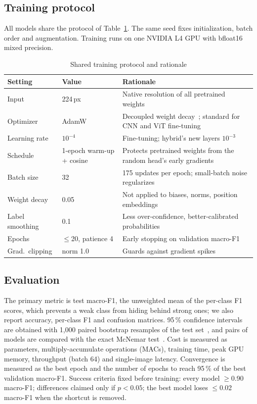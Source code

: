 \documentclass[conference]{IEEEtran}
\begin{document}
\subsection{Training protocol}
All models share the protocol of Table~\ref{tab:protocol}. The same seed fixes initialization, batch order and
augmentation. Training runs on one NVIDIA L4 GPU with bfloat16 mixed precision.

\begin{table}[t]
\caption{Shared training protocol and rationale}
\label{tab:protocol}
\centering
\footnotesize
\setlength{\tabcolsep}{3pt}
\begin{tabular}{@{}p{2.05cm}p{1.75cm}p{4.1cm}@{}}
\toprule
Setting & Value & Rationale \\
\midrule
Input & 224\,px & Native resolution of all pretrained weights \\
Optimizer & AdamW & Decoupled weight decay~\cite{loshchilov2019adamw}; standard for CNN and ViT fine-tuning \\
Learning rate & $10^{-4}$ & Fine-tuning; hybrid's new layers $10^{-3}$ \\
Schedule & 1-epoch warm-up + cosine & Protects pretrained weights from the random head's early gradients~\cite{goyal2017large,loshchilov2017sgdr} \\
Batch size & 32 & 175 updates per epoch; small-batch noise regularizes \\
Weight decay & 0.05 & Not applied to biases, norms, position embeddings \\
Label smoothing & 0.1 & Less over-confidence, better-calibrated probabilities~\cite{szegedy2016rethinking} \\
Epochs & $\le$20, patience 4 & Early stopping on validation macro-F1 \\
Grad.\ clipping & norm 1.0 & Guards against gradient spikes \\
\bottomrule
\end{tabular}
\end{table}

\subsection{Evaluation}
The primary metric is test macro-F1, the unweighted mean of the per-class F1 scores, which prevents a weak class from
hiding behind strong ones; we also report accuracy, per-class F1 and confusion matrices. 95\,\% confidence intervals are
obtained with 1{,}000 paired bootstrap resamples of the test set~\cite{efron1993bootstrap}, and pairs of models are
compared with the exact McNemar test~\cite{mcnemar1947,dietterich1998tests}. Cost is measured as parameters,
multiply-accumulate operations (MACs), training time, peak GPU memory, throughput (batch 64) and single-image latency.
Convergence is measured as the best epoch and the number of epochs to reach 95\,\% of the best validation macro-F1.
Success criteria fixed before training: every model $\ge$0.90 macro-F1; differences claimed only if $p<0.05$; the best
model loses $\le$0.02 macro-F1 when the shortcut is removed.
\end{document}
